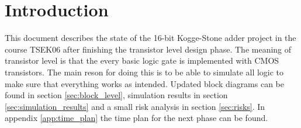 \section{Introduction}
This document describes the state of the 16-bit Kogge-Stone adder project in the course TSEK06 after finishing the transistor level design phase. The meaning of transistor level is that the every basic logic gate is implemented with CMOS transistors. The main reson for doing this is to be able to simulate all logic to make sure that everything works as intended. Updated block diagrams can be found in section \ref{sec:block_level}, simulation results in section \ref{sec:simulation_results} and a small risk analysis in section \ref{sec:risks}. In appendix \ref{app:time_plan} the time plan for the next phase can be found.
